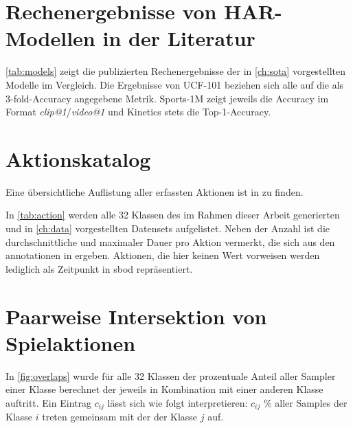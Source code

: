 \chapter{Rechenergebnisse von HAR-Modellen in der Literatur}
\label{ch:leaderboard}

\autoref{tab:models} zeigt die publizierten Rechenergebnisse der in \autoref{ch:sota} vorgestellten Modelle im Vergleich.
Die Ergebnisse von UCF-101 beziehen sich alle auf die als 3-fold-Accuracy angegebene Metrik.
Sports-1M zeigt jeweils die Accuracy im Format \emph{clip@1}/\emph{video@1} und Kinetics stets die Top-1-Accuracy.

\begin{figure}
    \label{tab:models}
\end{figure}

\chapter{Aktionskatalog}
\label{ch:aktionskatalog}

Eine übersichtliche Auflistung aller erfassten Aktionen ist in \cite{StatsbombDocs16} zu finden.


In \autoref{tab:action} werden alle 32 Klassen des im Rahmen dieser Arbeit generierten und in \autoref{ch:data} vorgestellten Datensets aufgelistet.
Neben der Anzahl ist die durchschnittliche und maximaler Dauer pro Aktion vermerkt, die sich aus den \gls{annotationen} in \cite{Statsbomb20} ergeben.
Aktionen, die hier keinen Wert vorweisen werden lediglich als Zeitpunkt in \gls{sbod} repräsentiert.

\begin{figure}
    \centering
    \begin{subfigure}{0.45\textwidth}
        \centering
    \end{subfigure}
    \begin{subfigure}{0.45\textwidth}
        \centering
    \end{subfigure}
    \label{tab:action}
\end{figure}

\chapter{Paarweise Intersektion von Spielaktionen}
\label{ch:overlaps}

In \autoref{fig:overlaps} wurde für alle 32 Klassen der prozentuale Anteil aller Sampler einer Klasse berechnet der jeweils in Kombination mit einer anderen Klasse auftritt.
Ein Eintrag $c_{ij}$ lässt sich wie folgt interpretieren:
$c_{ij}$ \% aller Samples der Klasse $i$ treten gemeinsam mit der der Klasse $j$ auf.

